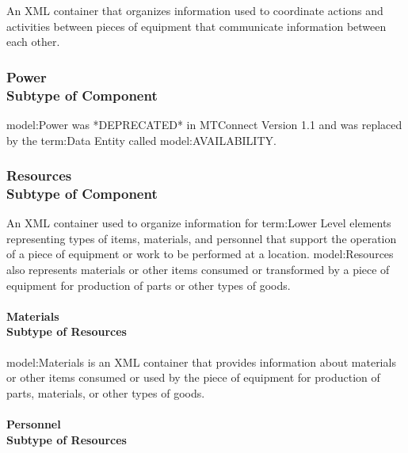 \FloatBarrier

An XML container that organizes information used to coordinate actions and activities between pieces of equipment that communicate information between each other.

\FloatBarrier
\subsubsection[Power]{Power \\ {\small Subtype of Component}}
  \label{type:Power}

\FloatBarrier

{model:Power} was *DEPRECATED* in MTConnect Version 1.1 and was replaced by the {term:Data Entity} called {model:AVAILABILITY}.

\FloatBarrier
\subsubsection[Resources]{Resources \\ {\small Subtype of Component}}
  \label{type:Resources}

\FloatBarrier

An XML container used to organize information for {term:Lower Level} elements representing types of items, materials, and personnel that support the operation of a piece of equipment or work to be performed at a location. {model:Resources} also represents materials or other items consumed or transformed by a piece of equipment for production of parts or other types of goods.

\paragraph[Materials]{Materials \\ {\small Subtype of Resources}}\mbox{}
  \label{type:Materials}

\FloatBarrier

{model:Materials} is an XML container that provides information about materials or other items consumed or used by the piece of equipment for production of parts, materials, or other types of goods.

\paragraph[Personnel]{Personnel \\ {\small Subtype of Resources}}\mbox{}
  \label{type:Personnel}

